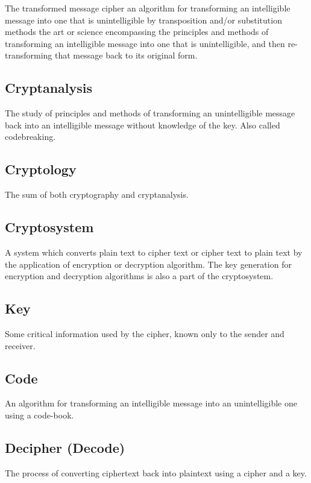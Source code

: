 \documentclass[british]{article}
\begin{document}
The transformed message cipher an algorithm for transforming an intelligible
message into one that is unintelligible by transposition and/or substitution
methods the art or science encompassing the principles and methods
of transforming an intelligible message into one that is unintelligible,
and then re-transforming that message back to its original form.

\subsection{Cryptanalysis}

The study of principles and methods of transforming an unintelligible
message back into an intelligible message without knowledge of the
key. Also called codebreaking.

\subsection{Cryptology}

The sum of both cryptography and cryptanalysis.

\subsection{Cryptosystem}

A system which converts plain text to cipher text or cipher text to
plain text by the application of encryption or decryption algorithm.
The key generation for encryption and decryption algorithms is also
a part of the cryptosystem.

\subsection{Key}

Some critical information used by the cipher, known only to the sender
and receiver.

\subsection{Code}

An algorithm for transforming an intelligible message into an unintelligible
one using a code-book.

\subsection{Decipher (Decode)}

The process of converting ciphertext back into plaintext using a cipher
and a key.
\end{document}
